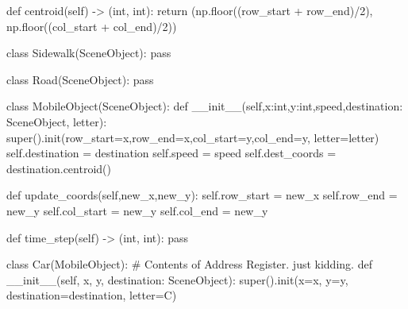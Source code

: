 \documentclass[
  letterpaper,
  DIV=11,
  numbers=noendperiod]{scrartcl}
\newenvironment{Shaded}{\begin{snugshade}}{\end{snugshade}}
\newcommand{\BuiltInTok}[1]{\textcolor[rgb]{0.00,0.23,0.31}{#1}}
\newcommand{\CommentTok}[1]{\textcolor[rgb]{0.37,0.37,0.37}{#1}}
\newcommand{\ControlFlowTok}[1]{\textcolor[rgb]{0.00,0.23,0.31}{#1}}
\newcommand{\DecValTok}[1]{\textcolor[rgb]{0.68,0.00,0.00}{#1}}
\newcommand{\FunctionTok}[1]{\textcolor[rgb]{0.28,0.35,0.67}{#1}}
\newcommand{\KeywordTok}[1]{\textcolor[rgb]{0.00,0.23,0.31}{#1}}
\newcommand{\NormalTok}[1]{\textcolor[rgb]{0.00,0.23,0.31}{#1}}
\newcommand{\OperatorTok}[1]{\textcolor[rgb]{0.37,0.37,0.37}{#1}}
\newcommand{\StringTok}[1]{\textcolor[rgb]{0.13,0.47,0.30}{#1}}
\newcommand{\VariableTok}[1]{\textcolor[rgb]{0.07,0.07,0.07}{#1}}
\begin{document}
\begin{Shaded}
\begin{Highlighting}[]
    \KeywordTok{def}\NormalTok{ centroid(}\VariableTok{self}\NormalTok{) }\OperatorTok{{-}\textgreater{}}\NormalTok{ (}\BuiltInTok{int}\NormalTok{, }\BuiltInTok{int}\NormalTok{):}
        \ControlFlowTok{return}\NormalTok{ (np.floor((row\_start }\OperatorTok{+}\NormalTok{ row\_end)}\OperatorTok{/}\DecValTok{2}\NormalTok{), np.floor((col\_start }\OperatorTok{+}\NormalTok{ col\_end)}\OperatorTok{/}\DecValTok{2}\NormalTok{))}

\KeywordTok{class}\NormalTok{ Sidewalk(SceneObject):}
    \ControlFlowTok{pass}

\KeywordTok{class}\NormalTok{ Road(SceneObject):}
    \ControlFlowTok{pass}

\KeywordTok{class}\NormalTok{ MobileObject(SceneObject):}
    \KeywordTok{def} \FunctionTok{\_\_init\_\_}\NormalTok{(}\VariableTok{self}\NormalTok{,x:}\BuiltInTok{int}\NormalTok{,y:}\BuiltInTok{int}\NormalTok{,speed,destination: SceneObject, letter):}
        \BuiltInTok{super}\NormalTok{().init(row\_start}\OperatorTok{=}\NormalTok{x,row\_end}\OperatorTok{=}\NormalTok{x,col\_start}\OperatorTok{=}\NormalTok{y,col\_end}\OperatorTok{=}\NormalTok{y, letter}\OperatorTok{=}\NormalTok{letter)}
        \VariableTok{self}\NormalTok{.destination }\OperatorTok{=}\NormalTok{ destination}
        \VariableTok{self}\NormalTok{.speed }\OperatorTok{=}\NormalTok{ speed}
        \VariableTok{self}\NormalTok{.dest\_coords }\OperatorTok{=}\NormalTok{ destination.centroid()}
    
    \KeywordTok{def}\NormalTok{ update\_coords(}\VariableTok{self}\NormalTok{,new\_x,new\_y):}
        \VariableTok{self}\NormalTok{.row\_start }\OperatorTok{=}\NormalTok{ new\_x}
        \VariableTok{self}\NormalTok{.row\_end }\OperatorTok{=}\NormalTok{ new\_y}
        \VariableTok{self}\NormalTok{.col\_start }\OperatorTok{=}\NormalTok{ new\_y}
        \VariableTok{self}\NormalTok{.col\_end }\OperatorTok{=}\NormalTok{ new\_y}
    
    \KeywordTok{def}\NormalTok{ time\_step(}\VariableTok{self}\NormalTok{) }\OperatorTok{{-}\textgreater{}}\NormalTok{ (}\BuiltInTok{int}\NormalTok{, }\BuiltInTok{int}\NormalTok{):}
        \ControlFlowTok{pass}    




\KeywordTok{class}\NormalTok{ Car(MobileObject): }\CommentTok{\# Contents of Address Register. just kidding.}
    \KeywordTok{def} \FunctionTok{\_\_init\_\_}\NormalTok{(}\VariableTok{self}\NormalTok{, x, y, destination: SceneObject):}
        \BuiltInTok{super}\NormalTok{().init(x}\OperatorTok{=}\NormalTok{x, y}\OperatorTok{=}\NormalTok{y, destination}\OperatorTok{=}\NormalTok{destination, letter}\OperatorTok{=}\StringTok{\textquotesingle{}C\textquotesingle{}}\NormalTok{)}


\end{Highlighting}
\end{Shaded}
\end{document}
